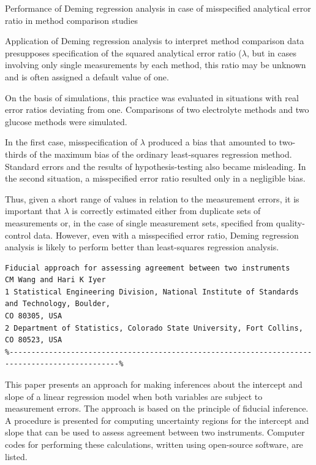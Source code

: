 \documentclass[MAIN.tex]{subfiles}
\begin{document}
\newpage
Performance of Deming regression analysis in case of misspecified analytical error ratio in method comparison studies

Application of Deming regression analysis to interpret method comparison data presupposes specification of the 
squared analytical error ratio ($\lambda$, but in cases involving only single measurements by each method, this 
ratio may be unknown and is often assigned a default value of one. 

On the basis of simulations, this practice was evaluated in situations with real error ratios deviating from one. 
Comparisons of two electrolyte methods and two glucose methods were simulated. 

In the first case, misspecification of $\lambda$ produced a bias that amounted to two-thirds of the maximum bias of the 
ordinary least-squares regression method. Standard errors and the results of hypothesis-testing also became misleading. 
In the second situation, a misspecified error ratio resulted only in a negligible bias. 

Thus, given a short range of values in relation to the measurement errors, it is important that $\lambda$ is correctly 
estimated either from duplicate sets of measurements or, in the case of single measurement sets, specified from 
quality-control data. However, even with a misspecified error ratio, Deming regression analysis is likely to perform 
better than least-squares regression analysis.

\newpage
\begin{verbatim}
Fiducial approach for assessing agreement between two instruments
CM Wang and Hari K Iyer
1 Statistical Engineering Division, National Institute of Standards and Technology, Boulder,
CO 80305, USA
2 Department of Statistics, Colorado State University, Fort Collins, CO 80523, USA
%-----------------------------------------------------------------------------------------------%
\end{verbatim}
This paper presents an approach for making inferences about the intercept and slope of a linear
regression model when both variables are subject to measurement errors. The approach is
based on the principle of fiducial inference. A procedure is presented for computing
uncertainty regions for the intercept and slope that can be used to assess agreement between
two instruments. Computer codes for performing these calculations, written using open-source
software, are listed.
\end{document}
